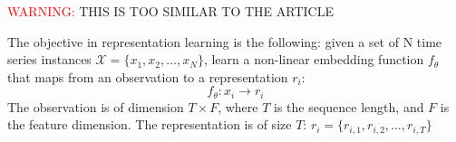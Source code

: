\textcolor{red}{WARNING:} THIS IS TOO SIMILAR TO THE ARTICLE


The objective in representation learning is the following: given a set of N time series instances $\mathcal{X}=\{x_1, x_2, \dots, x_N\}$, learn a non-linear embedding function $f_\theta$ that maps from an observation to a representation $r_i$:
\[
f_\theta: x_i \to r_i
\]
The observation is of dimension $T \times F$, where $T$ is the sequence length, and $F$ is the feature dimension. The representation is of size $T$: $r_i = \{r_{i,1}, r_{i,2}, \dots, r_{i,T}\}$
